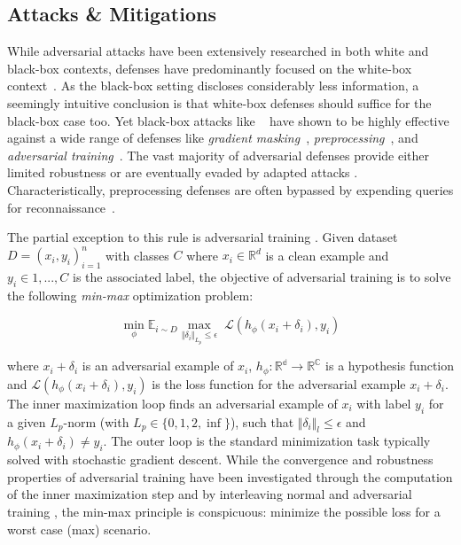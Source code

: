 \subsection{Attacks \& Mitigations}
While adversarial attacks have been extensively researched in both white and black-box contexts, defenses have predominantly focused on the white-box context~\cite{madry2017towards, wang2019convergence}.
As the black-box setting discloses considerably less information, a seemingly intuitive conclusion is that white-box defenses should suffice for the black-box case too.
Yet black-box attacks like ~\cite{brendel2018decision, chen2020hopskipjumpattack} have shown to be highly effective against a wide range of defenses like \emph{gradient masking}~\cite{athalye2018obfuscated}, \emph{preprocessing}~\cite{qin2021random, byun2022effectiveness}, and \emph{adversarial training}~\cite{madry2017towards}.
The vast majority of adversarial defenses provide either limited robustness or are eventually evaded by adapted attacks \cite{tramer2020adaptive}.
Characteristically, preprocessing defenses are often bypassed by expending queries for reconnaissance~\cite{sitawarin2022preprocessors}.

The partial exception to this rule is adversarial training \cite{madry2017towards}.
Given dataset $D = {(x_i, y_i)}^{n}_{i=1}$ with classes $C$ where $x_i \in \mathbb{R}^d$ is a clean example and $y_i \in {1,..., C}$ is the associated label, the objective of adversarial training is to solve the following \emph{min-max} optimization problem:

\begin{equation}
    \underset{\phi}{\operatorname{min}} \mathbb{E}_{i\sim D} \underset{\Vert \delta_i \Vert_{L_p} \leq \epsilon}{\operatorname{max}} \; \mathcal{L}(h_{\phi}(x_i + \delta_i), y_i)
\label{eqn:adv_train}
\end{equation}

\noindent where $x_i + \delta_i$ is an adversarial example of $x_i$, $h_\phi : \mathbb{R^d} \rightarrow \mathbb{R^C}$ is a hypothesis function and $\mathcal{L}(h_\phi(x_i + \delta_i), y_i)$ is the loss function for the adversarial example $x_i + \delta_i$.
The inner maximization loop finds an adversarial example of $x_i$ with label $y_i$ for a given $L_p$-norm (with $L_p \in \{0,1,2,\inf\}$), such that $\Vert \delta_i\Vert_{l} \leq \epsilon$ and $h_\phi(x_i + \delta_i) \neq y_i$.
The outer loop is the standard minimization task typically solved with stochastic gradient descent.
While the convergence and robustness properties of adversarial training have been investigated through the computation of the inner maximization step and by interleaving normal and adversarial training \cite{wang2019convergence}, the min-max principle is conspicuous: minimize the possible loss for a worst case (max) scenario.

